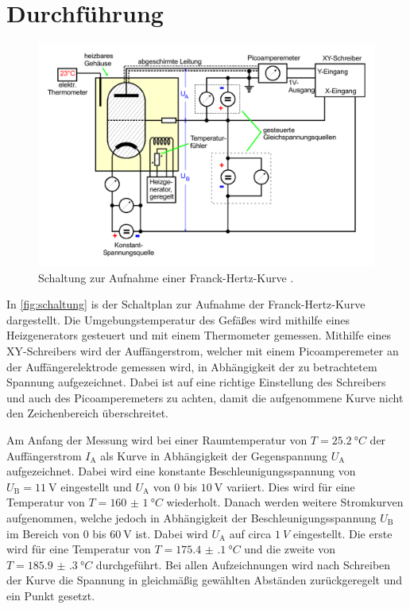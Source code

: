 \section{Durchführung}
\label{sec:Durchführung}

\begin{figure}[H]
    \centering
    \includegraphics[width=0.8\linewidth]{pictures/schaltplan.pdf}
    \caption{Schaltung zur Aufnahme einer Franck-Hertz-Kurve \cite{v601}.}
    \label{fig:schaltung}
\end{figure}

In \autoref{fig:schaltung} is der Schaltplan zur Aufnahme der Franck-Hertz-Kurve dargestellt.
Die Umgebungstemperatur des Gefäßes wird mithilfe eines Heizgenerators gesteuert und mit einem Thermometer gemessen.
Mithilfe eines XY-Schreibers wird der Auffängerstrom, welcher mit einem Picoamperemeter an der Auffängerelektrode gemessen wird,
in Abhängigkeit der zu betrachtetem Spannung aufgezeichnet.
Dabei ist auf eine richtige Einstellung des Schreibers und auch des Picoamperemeters zu achten, damit die aufgenommene Kurve nicht den Zeichenbereich überschreitet.

Am Anfang der Messung wird bei einer Raumtemperatur von $T = \qty{25,2}{°C}$ der Auffängerstrom $I_\text{A}$ als Kurve in Abhängigkeit der Gegenspannung $U_\text{A}$ aufgezeichnet.
Dabei wird eine konstante Beschleunigungsspannung von $U_\text{B} = \qty{11}{\volt}$ eingestellt und $U_\text{A}$ von 0 bis $\qty{10}{\volt}$ variiert.
Dies wird für eine Temperatur von $T = \qty{160(1)}{°C}$ wiederholt. 
Danach werden weitere Stromkurven aufgenommen, welche jedoch in Abhängigkeit der Beschleunigungsspannung $U_\text{B}$ im Bereich von 0 bis $\qty{60}{\volt}$ ist.
Dabei wird $U_\text{A}$ auf circa $\qty{1}{V}$ eingestellt.
Die erste wird für eine Temperatur von $T = \qty{175.4(1)}{°C}$ und die zweite von $T = \qty{185.9(3)}{°C}$ durchgeführt.
Bei allen Aufzeichnungen wird nach Schreiben der Kurve die Spannung in gleichmäßig gewählten Abständen zurückgeregelt und ein Punkt gesetzt.
